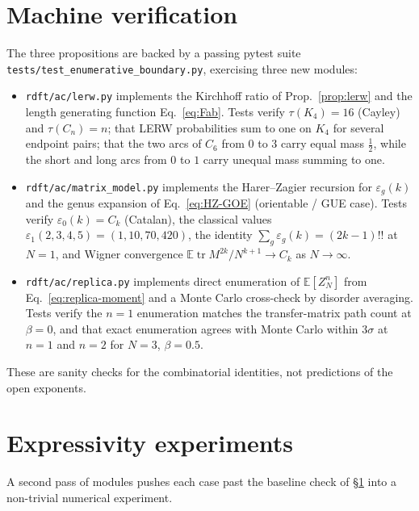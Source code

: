 \documentclass[10pt,a4paper,twocolumn]{article}
\theoremstyle{plain}
\theoremstyle{definition}
\newcommand{\Tree}{\tau}
\newcommand{\Tr}{\operatorname{tr}}
\newcommand{\Ex}{\mathbb{E}}
\begin{document}
\section{Machine verification}
\label{sec:machine}

The three propositions are backed by a passing pytest suite
\texttt{tests/test\_enumerative\_boundary.py}, exercising three new
modules:
\begin{itemize}[leftmargin=*]
\item \texttt{rdft/ac/lerw.py} implements the Kirchhoff ratio of
  Prop.~\ref{prop:lerw} and the length generating function
  Eq.~\eqref{eq:Fab}.  Tests verify $\Tree(K_4) = 16$ (Cayley) and
  $\Tree(C_n) = n$; that LERW probabilities sum to one on $K_4$ for
  several endpoint pairs; that the two arcs of $C_6$ from $0$ to $3$
  carry equal mass $\tfrac12$, while the short and long arcs from
  $0$ to $1$ carry unequal mass summing to one.
\item \texttt{rdft/ac/matrix\_model.py} implements the Harer--Zagier
  recursion for $\varepsilon_g(k)$ and the genus expansion of
  Eq.~\eqref{eq:HZ-GOE} (orientable / GUE case).  Tests verify
  $\varepsilon_0(k) = C_k$ (Catalan), the classical values
  $\varepsilon_1(2,3,4,5) = (1, 10, 70, 420)$, the identity
  $\sum_g \varepsilon_g(k) = (2k-1)!!$ at $N = 1$, and Wigner
  convergence $\Ex\Tr M^{2k} / N^{k+1} \to C_k$ as $N \to \infty$.
\item \texttt{rdft/ac/replica.py} implements direct enumeration of
  $\Ex[Z_N^n]$ from Eq.~\eqref{eq:replica-moment} and a Monte Carlo
  cross-check by disorder averaging.  Tests verify the $n = 1$
  enumeration matches the transfer-matrix path count at $\beta = 0$,
  and that exact enumeration agrees with Monte Carlo within
  $3\sigma$ at $n = 1$ and $n = 2$ for $N = 3$, $\beta = 0.5$.
\end{itemize}

\noindent
These are sanity checks for the combinatorial identities, not
predictions of the open exponents.

\section{Expressivity experiments}
\label{sec:experiments}

A second pass of modules pushes each case past the baseline check of
\S\ref{sec:machine} into a non-trivial numerical experiment.
\end{document}
